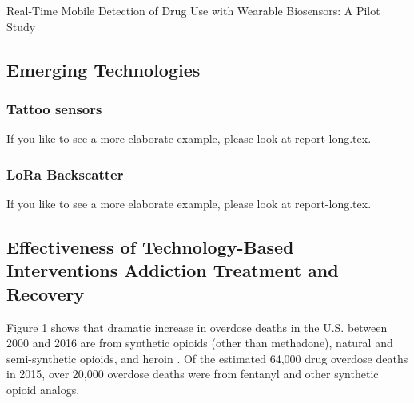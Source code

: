 \documentclass[sigconf]{acmart}
\begin{document}
Real-Time Mobile Detection of Drug Use with Wearable Biosensors:
A Pilot Study
\cite{carreiro15}

\subsection{Emerging Technologies}

\subsubsection{Tattoo sensors}

If you like to see a more elaborate example, please look at
report-long.tex. 


\subsubsection{LoRa Backscatter}

If you like to see a more elaborate example, please look at
report-long.tex. 


\subsection{Effectiveness of Technology-Based Interventions Addiction Treatment and Recovery}

Figure 1 shows that dramatic 
increase in overdose deaths in the U.S. between 2000 and 2016 are from synthetic 
opioids (other than methadone), natural and semi-synthetic opioids, and heroin 
\cite{nida17}. Of the estimated 64,000 drug overdose deaths in 2015, over 
20,000 overdose deaths were from fentanyl and other synthetic opioid analogs. 
\end{document}
